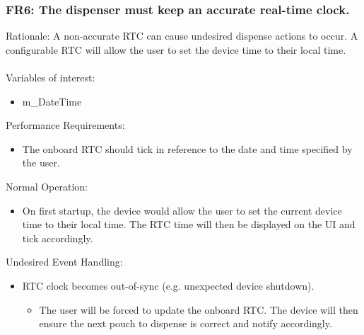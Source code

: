 \documentclass[12pt]{article}
\begin{document}
\subsubsection*{FR6: The dispenser must keep an accurate real-time clock.}
Rationale: A non-accurate RTC can cause undesired dispense actions to occur. A configurable RTC will allow the user to set the device time to their local time.
\\\\
Variables of interest:
\begin{itemize}[noitemsep,topsep=0pt]
    \item m\_DateTime
\end{itemize} 
\bigskip
Performance Requirements:
\begin{itemize}[noitemsep,topsep=0pt]
    \item The onboard RTC should tick in reference to the date and time specified by the user.
\end{itemize}
\bigskip
Normal Operation:
\begin{itemize}[noitemsep,topsep=0pt]
    \item On first startup, the device would allow the user to set the current device time to their local time. The RTC time will then be displayed on the UI and tick accordingly.
\end{itemize}
\bigskip
Undesired Event Handling:
\begin{itemize}[noitemsep,topsep=0pt]
    \item RTC clock becomes out-of-sync (e.g. unexpected device shutdown).
    \begin{itemize}
        \item The user will be forced to update the onboard RTC. The device will then ensure the next pouch to dispense is correct and notify accordingly.
    \end{itemize}
\end{itemize}
\bigskip

\end{document}
